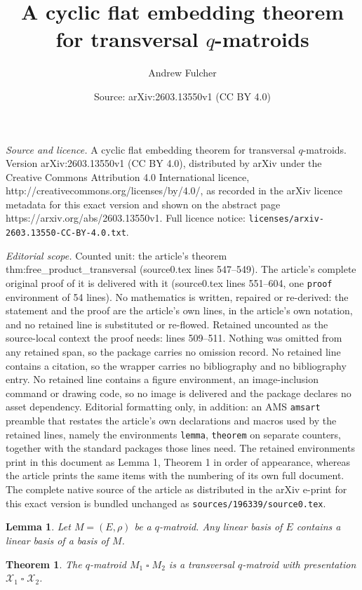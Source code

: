 \documentclass[10pt,a4paper]{amsart}
\title{A cyclic flat embedding theorem for transversal $q$-matroids}
\author{Andrew Fulcher}
\date{Source: arXiv:2603.13550v1 (CC BY 4.0)}
\newtheorem{lemma}{Lemma}
\newtheorem{theorem}{Theorem}
\newcommand{\sq}{\mathbin{\square}}
\begin{document}
\maketitle

\noindent\emph{Source and licence.} A cyclic flat embedding theorem for transversal $q$-matroids. Version arXiv:2603.13550v1 (CC BY 4.0), distributed by arXiv under the Creative Commons Attribution 4.0 International licence, http://creativecommons.org/licenses/by/4.0/, as recorded in the arXiv licence metadata for this exact version and shown on the abstract page https://arxiv.org/abs/2603.13550v1. Full licence notice: \texttt{licenses/arxiv-2603.13550-CC-BY-4.0.txt}.\par\smallskip

\noindent\textit{Editorial scope.} Counted unit: the article's theorem thm:free\_product\_transversal (source0.tex lines 547--549). The article's complete original proof of it is delivered with it (source0.tex lines 551--604, one \texttt{proof} environment of 54 lines). No mathematics is written, repaired or re-derived: the statement and the proof are the article's own lines, in the article's own notation, and no retained line is substituted or re-flowed.  Retained uncounted as the source-local context the proof needs: lines 509--511.  Nothing was omitted from any retained span, so the package carries no omission record.  No retained line contains a citation, so the wrapper carries no bibliography and no bibliography entry.  No retained line contains a figure environment, an image-inclusion command or drawing code, so no image is delivered and the package declares no asset dependency.  Editorial formatting only, in addition: an AMS \texttt{amsart} preamble that restates the article's own declarations and macros used by the retained lines, namely the environments \texttt{lemma}, \texttt{theorem} on separate counters, together with the standard packages those lines need.  The retained environments print in this document as Lemma 1, Theorem 1 in order of appearance, whereas the article prints the same items with the numbering of its own full document.  The complete native source of the article as distributed in the arXiv e-print for this exact version is bundled unchanged as \texttt{sources/196339/source0.tex}.
\begin{lemma}\label{lem:lin_basis_basis}
Let $M=(E,\rho)$ be a $q$-matroid. Any linear basis of $E$ contains a linear basis of a basis of $M$.
\end{lemma}

\begin{theorem}\label{thm:free_product_transversal}
The $q$-matroid $M_1\sq M_2$ is a transversal $q$-matroid with presentation $\mathcal{X}_1\sq\mathcal{X}_2$.
\end{theorem}
\end{document}
